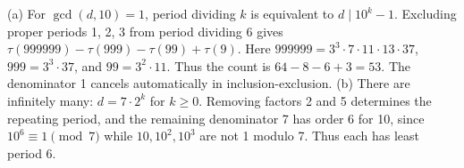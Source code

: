 (a) For $\gcd(d,10)=1 $, period dividing $ k $ is equivalent to $ d\mid10^k-1 $. Excluding proper periods 1, 2, 3 from period dividing 6 gives $\tau(999999)-\tau(999)-\tau(99)+\tau(9)$. Here $ 999999=3^3\cdot7\cdot11\cdot13\cdot37 $, $ 999=3^3\cdot37 $, and $ 99=3^2\cdot11 $. Thus the count is $ 64-8-6+3=\boxed{53}$. The denominator 1 cancels automatically in inclusion-exclusion. (b) There are infinitely many: $ d=7\cdot2^k $ for $ k\ge0 $. Removing factors 2 and 5 determines the repeating period, and the remaining denominator 7 has order 6 for 10, since $ 10^6\equiv1\pmod7 $ while $ 10,10^2,10^3 $ are not 1 modulo 7. Thus each has least period 6.
